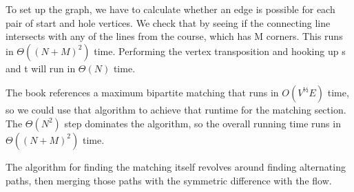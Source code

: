 \documentclass{article}
\begin{document}
To set up the graph, we have to calculate whether an edge is possible for each pair of start and hole vertices. We check that by seeing if the connecting line intersects with any of the lines from the course, which has M corners. This runs in $\Theta((N+M)^2)$ time. Performing the vertex transposition and hooking up s and t will run in $\Theta(N)$ time.

The book references a maximum bipartite matching that runs in $O( V^{½} E)$ time, so we could use that algorithm to achieve that runtime for the matching section. The $\Theta(N^2)$ step dominates the algorithm, so the overall running time runs in $\Theta((N+M)^2)$ time.

The algorithm for finding the matching itself revolves around finding alternating paths, then merging those paths with the symmetric difference with the flow.
\end{document}
